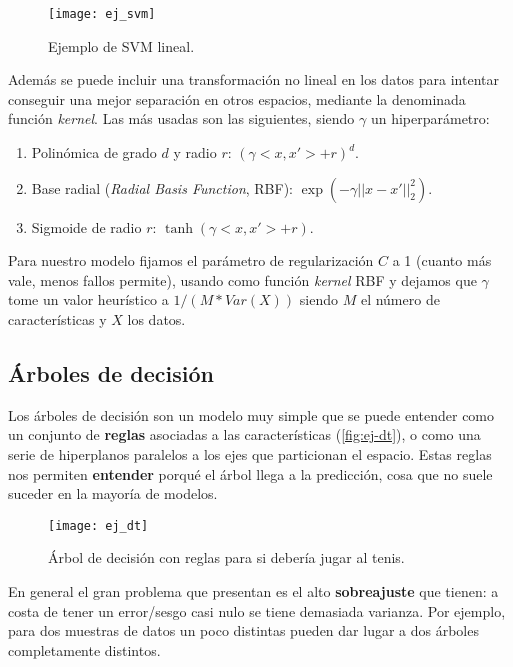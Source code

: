 \begin{figure}[htbp]
  \centering
  \texttt{[image: ej\_svm]}
  \caption{Ejemplo de SVM lineal.}
  \label{fig:ej-svm}
\end{figure}

Además se puede incluir una transformación no lineal en los datos para intentar conseguir una mejor separación en otros espacios, mediante la denominada función \emph{kernel}. Las más usadas son las siguientes, siendo $\gamma$ un hiperparámetro:

  \begin{enumerate}
    \item Polinómica de grado $d$ y radio $r$: $(\gamma<x, x'> + r)^d$.
    \item Base radial (\emph{Radial Basis Function}, RBF): $\exp(-\gamma||x - x'||^2_2)$.
    \item Sigmoide de radio $r$: $\tanh(\gamma<x, x'> + r)$.
  \end{enumerate}

Para nuestro modelo fijamos el parámetro de regularización $C$ a 1 (cuanto más vale, menos fallos permite), usando como función \emph{kernel} RBF y dejamos que $\gamma$ tome un valor heurístico a $1 / (M * Var(X))$ siendo $M$ el número de características y $X$ los datos.

\subsection{Árboles de decisión}

Los árboles de decisión son un modelo muy simple que se puede entender como un conjunto de \textbf{reglas} asociadas a las características (\autoref{fig:ej-dt}), o como una serie de hiperplanos paralelos a los ejes que particionan el espacio. Estas reglas nos permiten \textbf{entender} porqué el árbol llega a la predicción, cosa que no suele suceder en la mayoría de modelos.

\begin{figure}[htbp]
  \centering
  \texttt{[image: ej\_dt]}
  \caption{Árbol de decisión con reglas para si debería jugar al tenis.}
  \label{fig:ej-dt}
\end{figure}

En general el gran problema que presentan es el alto \textbf{sobreajuste} que tienen: a costa de tener un error/sesgo casi nulo se tiene demasiada varianza. Por ejemplo, para dos muestras de datos un poco distintas pueden dar lugar a dos árboles completamente distintos.


